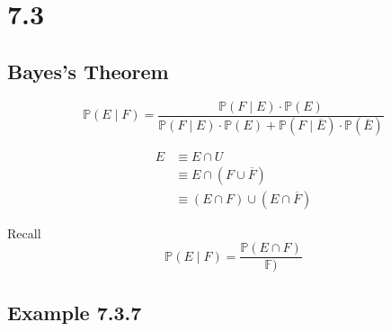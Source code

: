 \documentclass{article}
\begin{document}
\section{7.3}

\subsection{Bayes's Theorem}

\begin{equation}
	\mathbb{P}(E \mid F) = \frac{ \mathbb{P}(F \mid E) \cdot \mathbb{P}(E) }{ \mathbb{P}(F \mid E) \cdot \mathbb{P}(E) + \mathbb{P}(F \mid \overline{E}) \cdot \mathbb{P}(\overline{E}) }
\end{equation}

\begin{align*}
	E & \equiv E \cap U                              \\
	  & \equiv E \cap (F \cup \overline{F})          \\
	  & \equiv (E \cap F) \cup (E \cap \overline{F})
\end{align*}

Recall \[ \mathbb{P}(E \mid F) = \frac{ \mathbb{P}(E \cap F) }{ \mathbb{F} ) } \]

\subsection{Example 7.3.7}
\end{document}
